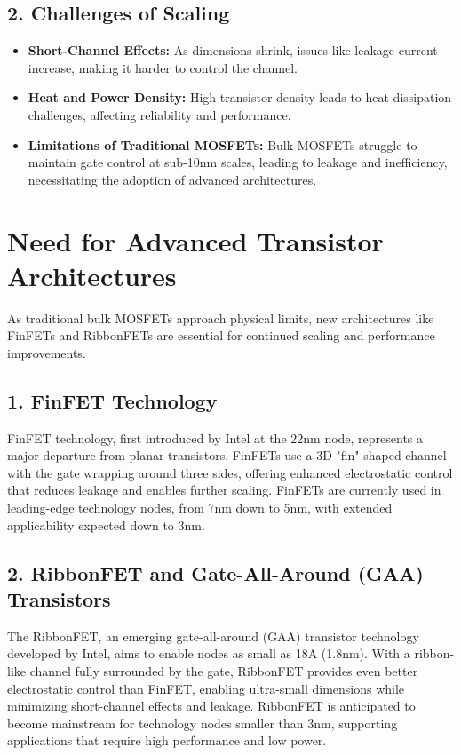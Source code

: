 \documentclass[12pt]{report}
\begin{document}
\begin{titlepage}
\subsection*{2. Challenges of Scaling}
\begin{itemize}
    \item \textbf{Short-Channel Effects:} As dimensions shrink, issues like leakage current increase, making it harder to control the channel.
    \item \textbf{Heat and Power Density:} High transistor density leads to heat dissipation challenges, affecting reliability and performance.
    \item \textbf{Limitations of Traditional MOSFETs:} Bulk MOSFETs struggle to maintain gate control at sub-10nm scales, leading to leakage and inefficiency, necessitating the adoption of advanced architectures.
\end{itemize}

\section{Need for Advanced Transistor Architectures}

As traditional bulk MOSFETs approach physical limits, new architectures like FinFETs and RibbonFETs are essential for continued scaling and performance improvements.

\subsection*{1. FinFET Technology}
FinFET technology, first introduced by Intel at the 22nm node, represents a major departure from planar transistors. FinFETs use a 3D "fin"-shaped channel with the gate wrapping around three sides, offering enhanced electrostatic control that reduces leakage and enables further scaling. FinFETs are currently used in leading-edge technology nodes, from 7nm down to 5nm, with extended applicability expected down to 3nm.

\subsection*{2. RibbonFET and Gate-All-Around (GAA) Transistors}
The RibbonFET, an emerging gate-all-around (GAA) transistor technology developed by Intel, aims to enable nodes as small as 18A (1.8nm). With a ribbon-like channel fully surrounded by the gate, RibbonFET provides even better electrostatic control than FinFET, enabling ultra-small dimensions while minimizing short-channel effects and leakage. RibbonFET is anticipated to become mainstream for technology nodes smaller than 3nm, supporting applications that require high performance and low power.


\end{titlepage}
\end{document}
